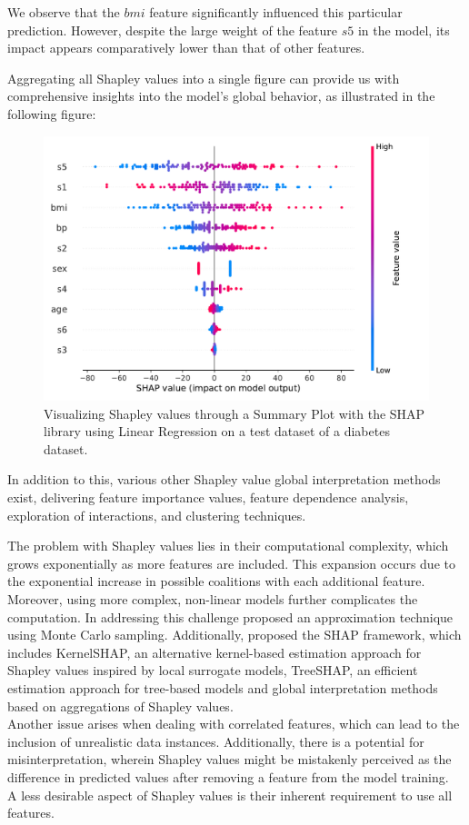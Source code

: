 We observe that the $bmi$ feature significantly influenced this particular prediction. However, despite the large weight of the feature $s5$ in the model, its impact appears comparatively lower than that of other features. 

Aggregating all Shapley values into a single figure can provide us with comprehensive insights into the model's global behavior, as illustrated in the following figure:

\begin{figure}[H]
    \centering
    \includegraphics[width=0.8\linewidth]{pics/shap_summary_plot.pdf}
    \caption[Visualizing Shapley values through a Summary Plot]{Visualizing Shapley values through a Summary Plot with the SHAP library using Linear Regression on a test dataset of a diabetes dataset.}
    \label{fig:shapley_sum}
\end{figure}

In addition to this, various other Shapley value global interpretation methods exist, delivering feature importance values, feature dependence analysis, exploration of interactions, and clustering techniques.

The problem with Shapley values lies in their computational complexity, which grows exponentially as more features are included. This expansion occurs due to the exponential increase in possible coalitions with each additional feature. Moreover, using more complex, non-linear models further complicates the computation. In addressing this challenge \cite{vstrumbelj2014explaining} proposed an approximation technique using Monte Carlo sampling.
Additionally, \cite{lundberg2017unified} proposed the SHAP framework, which includes KernelSHAP, an alternative kernel-based estimation approach for Shapley values inspired by local surrogate models, TreeSHAP, an efficient estimation approach for tree-based models and global interpretation methods based on aggregations of Shapley values. \\
Another issue arises when dealing with correlated features, which can lead to the inclusion of unrealistic data instances. Additionally, there is a potential for misinterpretation, wherein Shapley values might be mistakenly perceived as the difference in predicted values after removing a feature from the model training. \\
A less desirable aspect of Shapley values is their inherent requirement to use all features.
